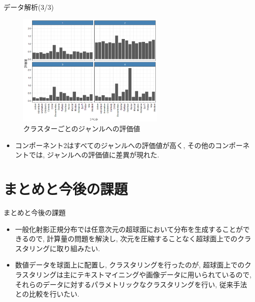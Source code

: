 \documentclass[dvipdfmx]{beamer} %
\begin{document}
\begin{frame}{データ解析(3/3)}
\begin{figure}[tbp]
\begin{center}
\includegraphics[clip,height= 55mm]{data/cluster_plot.png}
\end{center}
\caption{クラスターごとのジャンルへの評価値}
\label{clustergenre}
\end{figure}

\begin{itemize}
	\item コンポーネント2はすべてのジャンルへの評価値が高く, その他のコンポーネントでは, ジャンルへの評価値に差異が現れた.
\end{itemize}
\end{frame}

\section{まとめと今後の課題}
\begin{frame}{まとめと今後の課題}

\begin{itemize}

\item
一般化射影正規分布では任意次元の超球面において分布を生成することができるので, 計算量の問題を解決し, 次元を圧縮することなく超球面上でのクラスタリングに取り組みたい. 
\item
数値データを球面上に配置し, クラスタリングを行ったのが, 超球面上でのクラスタリングは主にテキストマイニングや画像データに用いられているので, それらのデータに対するパラメトリックなクラスタリングを行い, 従来手法との比較を行いたい. 

\end{itemize}

\end{frame}
\end{document}
